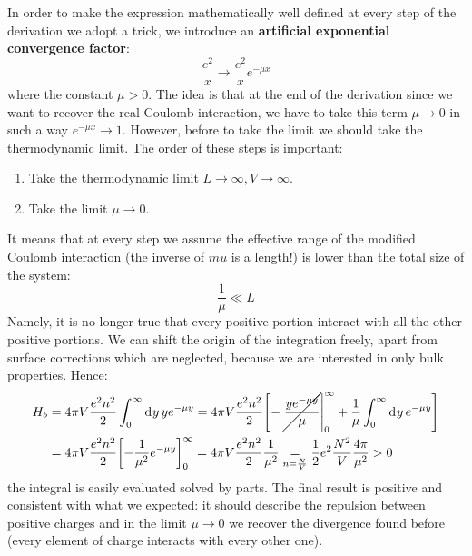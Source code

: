\documentclass[../main/main.tex]{subfiles}
\begin{document}
In order to make the expression mathematically well defined at every step of the derivation we adopt a trick, we introduce an \textbf{artificial exponential convergence factor}: 
\begin{equation*}
  \frac{e^2}{x} \rightarrow \frac{e^2}{x} e^{- \mu x}
\end{equation*}
where the constant \( \mu > 0 \). The idea is that at the end of the derivation since we want to recover the real Coulomb interaction, we have to take this term \( \mu \rightarrow 0 \) in such a way \( e^{- \mu x} \rightarrow 1 \). However, before to take the limit we should take the thermodynamic limit. The order of these steps is important:
\begin{enumerate}
\item Take the thermodynamic limit \( L \rightarrow \infty, V \rightarrow \infty   \).
\item Take the limit \( \mu \rightarrow  0\).
\end{enumerate}
It means that at every step we assume the effective range of the modified Coulomb interaction (the inverse of \( mu \) is a length!) is lower than the total size of the system:
\begin{equation*}
  \frac{1}{\mu }\ll L
\end{equation*}
Namely, it is no longer true that every positive portion interact with all the other positive portions. We can shift the origin of the integration freely, apart from surface corrections which are neglected, because we are interested in only bulk properties.
Hence:
\begin{equation}
\begin{split}
H_b  &= 4 \pi V \frac{e^2 n^2}{2} \int_{0}^{\infty} \dd[]{y} y e^{- \mu y}    =  4 \pi V \frac{e^2 n^2}{2} \qty[- \eval{ \cancel{\frac{y e^{- \mu y} }{\mu }} }_0^\infty   + \frac{1}{\mu } \int_{0}^{\infty} \dd[]{y} e^{- \mu y} ]   \\
&= 4 \pi V \frac{e^2 n^2}{2} \qty[- \frac{1}{\mu ^2} e^{- \mu y} ]_0^\infty  =  4 \pi V \frac{e^2 n^2}{2} \frac{1}{\mu ^2}
\underset{n=\frac{N}{V}}{=}  \frac{1}{2} e^2 \frac{N^2}{V} \frac{4 \pi }{\mu ^2} > 0
\end{split}
\end{equation}
the integral is easily evaluated solved by parts. The final result is positive and consistent with what we expected: it should describe the repulsion between positive charges and in the limit \( \mu  \rightarrow 0 \) we recover the divergence found before (every element of charge interacts with every other one).
\end{document}
